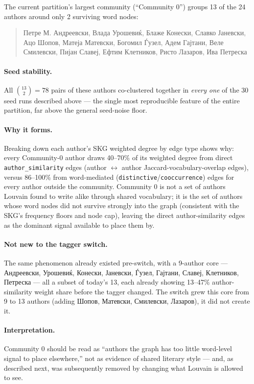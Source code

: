 \documentclass[11pt]{article}
\begin{document}
The current partition's largest community (``Community 0'') groups 13 of
the 24 authors around only 2 surviving word nodes:

\begin{quote}
\small
Петре М. Андреевски, Влада Урошевиќ, Блаже Конески, Славко Јаневски, Ацо
Шопов, Матеја Матевски, Богомил Ѓузел, Адем Гајтани, Веле Смилевски, Пијан
Славеј, Ефтим Клетников, Ристо Лазаров, Ива Петреска
\end{quote}

\paragraph{Seed stability.} All $\binom{13}{2} = 78$ pairs of these authors
co-clustered together in \emph{every one} of the 30 seed runs described
above — the single most reproducible feature of the entire partition, far
above the general seed-noise floor.

\paragraph{Why it forms.} Breaking down each author's SKG weighted degree by
edge type shows why: every Community-0 author draws 40--70\% of its
weighted degree from direct \texttt{author\_similarity} edges (author
$\leftrightarrow$ author Jaccard-vocabulary-overlap edges), versus
86--100\% from word-mediated (\texttt{distinctive}/\texttt{cooccurrence})
edges for every author outside the community. Community 0 is not a set of
authors Louvain found to write alike through shared vocabulary; it is the
set of authors whose word nodes did not survive strongly into the graph
(consistent with the SKG's frequency floors and node cap), leaving the
direct author-similarity edges as the dominant signal available to place
them by.

\paragraph{Not new to the tagger switch.} The same phenomenon already
existed pre-switch, with a 9-author core — Андреевски, Урошевиќ, Конески,
Јаневски, Ѓузел, Гајтани, Славеј, Клетников, Петреска — all a subset of
today's 13, each already showing 13--47\% author-similarity weight share
before the tagger changed. The switch grew this core from 9 to 13 authors
(adding Шопов, Матевски, Смилевски, Лазаров), it did not create it.

\paragraph{Interpretation.} Community 0 should be read as ``authors the
graph has too little word-level signal to place elsewhere,'' not as
evidence of shared literary style — and, as described next, was subsequently
removed by changing what Louvain is allowed to see.
\end{document}
